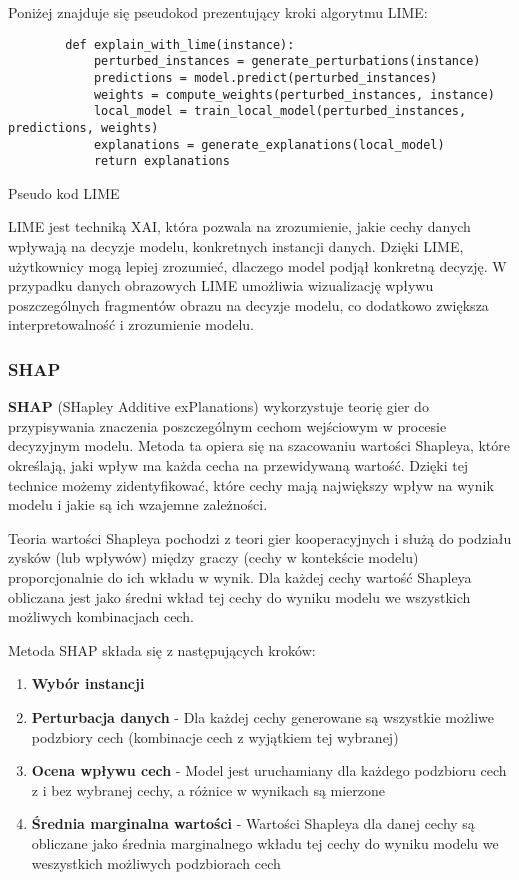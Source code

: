 Poniżej znajduje się pseudokod prezentujący kroki algorytmu LIME:
\begin{listing}
	\begin{verbatim}
        def explain_with_lime(instance):
            perturbed_instances = generate_perturbations(instance)
            predictions = model.predict(perturbed_instances)
            weights = compute_weights(perturbed_instances, instance)
            local_model = train_local_model(perturbed_instances, predictions, weights)
            explanations = generate_explanations(local_model)
            return explanations
  \end{verbatim}
	\caption{Pseudo kod LIME} \label{listing:lime}
\end{listing}

LIME jest techniką XAI, która pozwala na zrozumienie, jakie cechy danych wpływają na decyzje modelu, konkretnych instancji danych.
Dzięki LIME, użytkownicy mogą lepiej zrozumieć, dlaczego model podjął konkretną decyzję.
W przypadku danych obrazowych LIME umożliwia wizualizację wpływu poszczególnych fragmentów obrazu na decyzje modelu, co dodatkowo zwiększa interpretowalność i zrozumienie modelu.

\subsubsection*{SHAP}
\textbf{SHAP} \cite{lundberg2017unified} (SHapley Additive exPlanations) wykorzystuje teorię gier do przypisywania znaczenia poszczególnym cechom wejściowym w procesie decyzyjnym modelu.
Metoda ta opiera się na szacowaniu wartości Shapleya, które określają, jaki wpływ ma każda cecha na przewidywaną wartość.
Dzięki tej technice możemy zidentyfikować, które cechy mają największy wpływ na wynik modelu i jakie są ich wzajemne zależności.

Teoria wartości Shapleya pochodzi z teori gier kooperacyjnych i służą do podziału zysków (lub wpływów) między graczy (cechy w kontekście modelu) proporcjonalnie do ich wkładu w wynik.
Dla każdej cechy wartość Shapleya obliczana jest jako średni wkład tej cechy do wyniku modelu we wszystkich możliwych kombinacjach cech.

Metoda SHAP składa się z następujących kroków:
\begin{enumerate}
	\item \textbf{Wybór instancji}
	\item \textbf{Perturbacja danych} - Dla każdej cechy generowane są wszystkie możliwe podzbiory cech (kombinacje cech z wyjątkiem tej wybranej)
	\item \textbf{Ocena wpływu cech} - Model jest uruchamiany dla każdego podzbioru cech z i bez wybranej cechy, a różnice w wynikach są mierzone
	\item \textbf{Średnia marginalna wartości} - Wartości Shapleya dla danej cechy są obliczane jako średnia marginalnego wkładu tej cechy do wyniku modelu we weszystkich możliwych podzbiorach cech
\end{enumerate}

